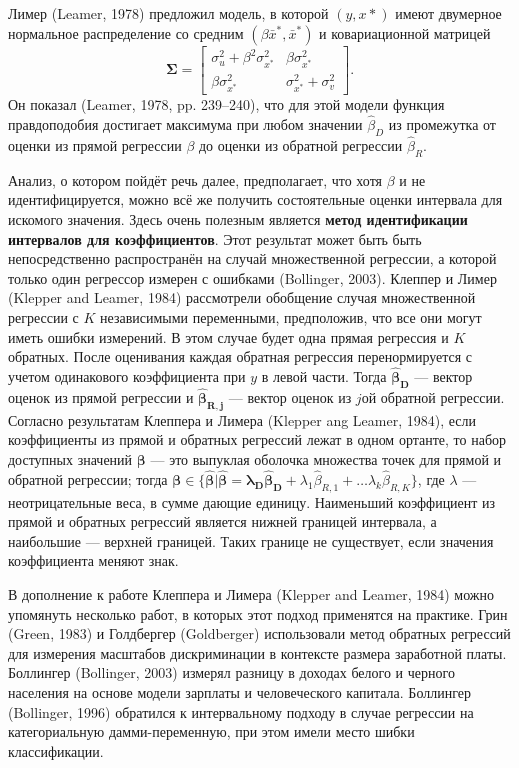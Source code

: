 Лимер (Leamer, 1978) предложил модель, в которой $(y, x*)$ имеют двумерное нормальное распределение со средним $(\beta \bar{x}^*, \bar{x}^*)$ и ковариационной матрицей 
\begin{equation}
\mathbf{\Sigma}=
\begin{bmatrix}
\sigma^2_u+\beta^2\sigma^2_{x^*} & \beta\sigma^2_{x^*} \\ \beta\sigma^2_{x^*} & \sigma^2_{x^*}+\sigma^2_v
\end{bmatrix} .
\end{equation}
Он показал (Leamer, 1978, pp. 239--240), что для этой модели функция правдоподобия достигает максимума при любом значении $\widehat{\beta}_D$ из промежутка от оценки из прямой регрессии $\beta$ до оценки из обратной регрессии $\widehat{\beta}_R$.

Анализ, о котором пойдёт речь далее, предполагает, что хотя $\beta$ и не идентифицируется, можно всё же получить состоятельные оценки интервала для искомого значения. Здесь очень полезным является {\bf метод идентификации интервалов для коэффициентов}. Этот результат может быть быть непосредственно распространён на случай множественной регрессии, а которой только один регрессор измерен с ошибками (Bollinger, 2003). Клеппер и Лимер (Klepper and Leamer, 1984) рассмотрели обобщение случая множественной регрессии с $K$ независимыми переменными, предположив, что все они могут иметь ошибки измерений. В этом случае будет одна прямая регрессия и $K$ обратных. После оценивания каждая обратная регрессия перенормируется с учетом одинакового коэффициента при $y$ в левой части. Тогда $\mathbf{\widehat{\beta}_{D}}$ --- вектор оценок из прямой регрессии и $\mathbf{\widehat{\beta}_{R,j}}$ --- вектор оценок из $j$ой обратной регрессии. Согласно результатам Клеппера и Лимера (Klepper ang Leamer, 1984), если коэффициенты из прямой и обратных регрессий лежат в одном ортанте, то набор доступных значений $\mathbf{\beta}$ --- это выпуклая оболочка множества точек для прямой и обратной регрессии; тогда $\mathbf{\beta} \in \{ \mathbf{\widehat{\beta}|\widehat{\beta}=\lambda_D \widehat{\beta}_D}+\lambda_1 \widehat{\beta}_{R,1}+ \dots \lambda_k \widehat{\beta}_{R,K} \}$, где $\lambda$ --- неотрицательные веса, в сумме дающие единицу. Наименьший коэффициент из прямой и обратных регрессий является нижней границей интервала, а наибольшие --- верхней границей. Таких границе не существует, если значения коэффициента меняют знак.

В дополнение к работе Клеппера и Лимера (Klepper and Leamer, 1984) можно упомянуть несколько работ, в которых этот подход применятся на практике. Грин (Green, 1983) и Голдбергер (Goldberger) использовали метод обратных регрессий для измерения масштабов дискриминации в контексте размера заработной платы. Боллингер (Bollinger, 2003) измерял разницу в доходах белого и черного населения на основе модели зарплаты и человеческого капитала. Боллингер (Bollinger, 1996) обратился к интервальному подходу в случае регрессии на категориальную дамми-переменную, при этом имели место шибки классификации.


